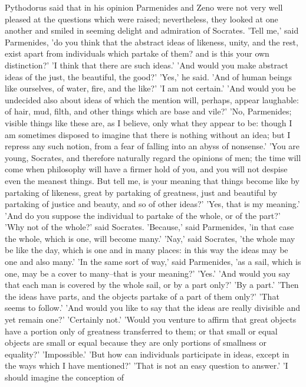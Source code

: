 Pythodorus said that in his opinion Parmenides and Zeno were not very
well pleased at the questions which were raised; nevertheless, they
looked at one another and smiled in seeming delight and admiration of
Socrates. 'Tell me,' said Parmenides, 'do you think that the abstract
ideas of likeness, unity, and the rest, exist apart from individuals
which partake of them? and is this your own distinction?' 'I think that
there are such ideas.' 'And would you make abstract ideas of the just,
the beautiful, the good?' 'Yes,' he said. 'And of human beings like
ourselves, of water, fire, and the like?' 'I am not certain.' 'And would
you be undecided also about ideas of which the mention will, perhaps,
appear laughable: of hair, mud, filth, and other things which are base
and vile?' 'No, Parmenides; visible things like these are, as I believe,
only what they appear to be: though I am sometimes disposed to imagine
that there is nothing without an idea; but I repress any such notion,
from a fear of falling into an abyss of nonsense.' 'You are young,
Socrates, and therefore naturally regard the opinions of men; the time
will come when philosophy will have a firmer hold of you, and you will
not despise even the meanest things. But tell me, is your meaning that
things become like by partaking of likeness, great by partaking of
greatness, just and beautiful by partaking of justice and beauty, and
so of other ideas?' 'Yes, that is my meaning.' 'And do you suppose the
individual to partake of the whole, or of the part?' 'Why not of the
whole?' said Socrates. 'Because,' said Parmenides, 'in that case the
whole, which is one, will become many.' 'Nay,' said Socrates, 'the whole
may be like the day, which is one and in many places: in this way
the ideas may be one and also many.' 'In the same sort of way,' said
Parmenides, 'as a sail, which is one, may be a cover to many--that is
your meaning?' 'Yes.' 'And would you say that each man is covered by the
whole sail, or by a part only?' 'By a part.' 'Then the ideas have parts,
and the objects partake of a part of them only?' 'That seems to follow.'
'And would you like to say that the ideas are really divisible and yet
remain one?' 'Certainly not.' 'Would you venture to affirm that great
objects have a portion only of greatness transferred to them; or that
small or equal objects are small or equal because they are only portions
of smallness or equality?' 'Impossible.' 'But how can individuals
participate in ideas, except in the ways which I have mentioned?' 'That
is not an easy question to answer.' 'I should imagine the conception of
